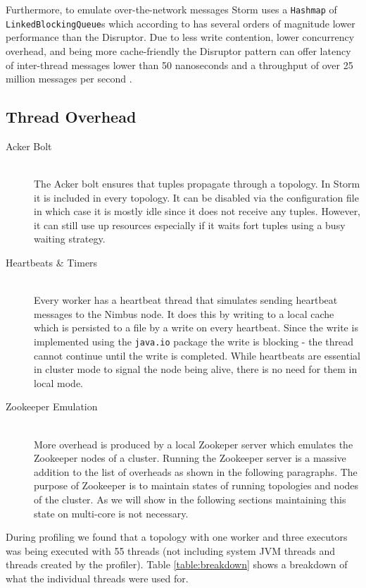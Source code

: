 \documentclass[bsc,logo,frontabs,twoside,singlespacing,normalheadings,parskip]{infthesis}\usepackage[]{graphicx}\usepackage[]{color}
\begin{document}
Furthermore, to emulate over-the-network messages Storm uses a \texttt{Hashmap} of \texttt{LinkedBlockingQueue}s which according to \cite{Thompson_Farley_Barker_Gee_Stewart_2011} has several orders of magnitude lower performance than the Disruptor. Due to less write contention, lower concurrency overhead, and being more cache-friendly the Disruptor pattern can offer latency of inter-thread messages lower than 50 nanoseconds and a throughput of over 25 million messages per second \cite{Thompson_Farley_Barker_Gee_Stewart_2011}.

\subsection{Thread Overhead}

\begin{description}
	\item[Acker Bolt] \hfill \\
	The Acker bolt ensures that tuples propagate through a topology. In Storm it is included in every topology. It can be disabled via the configuration file in which case it is mostly idle since it does not receive any tuples. However, it can still use up resources especially if it waits fort tuples using a busy waiting strategy.
	\item[Heartbeats \& Timers] \hfill \\
	Every worker has a heartbeat thread that simulates sending heartbeat messages to the Nimbus node. It does this by writing to a local cache which is persisted to a file by a write on every heartbeat. Since the write is implemented using the \texttt{java.io} package the write is blocking - the thread cannot continue until the write is completed. While heartbeats are essential in cluster mode to signal the node being alive, there is no need for them in local mode.
	\item[Zookeeper Emulation] \hfill \\
	More overhead is produced by a local Zookeper server which emulates the Zookeeper nodes of a cluster. Running the Zookeeper server is a massive addition to the list of overheads as shown in the following paragraphs. The purpose of Zookeeper is to maintain states of running topologies and nodes of the cluster. As we will show in the following sections maintaining this state on multi-core is not necessary.
\end{description}

During profiling we found that a topology with one worker and three executors was being executed with 55 threads (not including system JVM threads and threads created by the profiler). Table \ref{table:breakdown} shows a breakdown of what the individual threads were used for.
\end{document}
